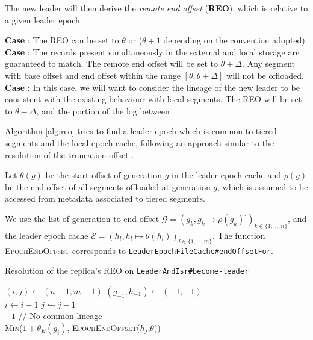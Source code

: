 \documentclass{article}
\newcommand*\circled[1]{\tikz[baseline=(char.base)]{
		\node[shape=circle,draw,inner sep=1pt] (char) {#1};}}
\begin{document}
The new leader will then derive the \textit{remote end offset} (\textbf{REO}), which is relative to a given leader epoch.

\begin{outline}[enumerate]
	\1 \textbf{Case \circled{A}}: The REO can be set to $\theta$ or ($\theta +1$ depending on the convention adopted).
	\1 \textbf{Case \circled{B}}: The records present simultaneously in the external and local storage are guaranteed to match. The remote end offset will be set to $\theta+\Delta$. Any segment with base offset and end offset within the range $[\theta, \theta+\Delta]$ will not be offloaded.
	\1 \textbf{Case \circled{C}}: In this case, we will want to consider the lineage of the new leader to be consistent with the existing behaviour with local segments. The REO will be set to $\theta - \Delta$, and the portion of the log between  
\end{outline}

Algorithm \ref{alg:reo} tries to find a leader epoch which is common to tiered segments and the local epoch cache, following an approach similar to the resolution of the truncation offset \cite{KIP279}.

Let $\theta(g)$ be the start offset of generation $g$ in the leader epoch cache and $\rho(g)$ be the end offset of all segments offloaded at generation $g$, which is assumed to be accessed from metadata associated to tiered segments.

We use the list of generation to end offset $\mathcal{G}=(g_k, g_k \mapsto \rho(g_k)])_{k \in \{1,...,n\}}$, and the leader epoch cache $\mathcal{E}=(h_l, h_l \mapsto \theta(h_l))_{l \in \{1,...,m\}}$. The function \textsc{EpochEndOffset} corresponds to \texttt{LeaderEpochFileCache\#endOffsetFor}.

\begin{algorithm}[H]
	\caption{Resolution of the replica's REO on \texttt{LeaderAndIsr\#become-leader}}
	\label{alg:reo}
	
	\begin{algorithmic}[1]
			\State	$(i,j) \leftarrow (n-1,m-1)$
			\State	$(g_{-1}, h_{-1}) \leftarrow (-1,-1)$
			\\
					\State $i \leftarrow i - 1$
				\EndWhile
					\State $j \leftarrow j - 1$
				\EndWhile
			\EndWhile
			\\
				\State \Return $-1$ // No common lineage
			\EndIf
			\\
			\State \Return \textsc{Min}($1 + \theta_E(g_i)$, \textsc{EpochEndOffset}($h_j$,$\theta$))
			\\
		\EndFunction
	\end{algorithmic}	
\end{algorithm}
\end{document}
